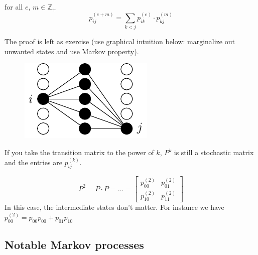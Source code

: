 \documentclass{article}
\begin{document}
\begin{proposition}{}
    for all $e$, $m \in \mathbb{Z}_+$
    \begin{equation}\label{chapkolm}
        p_{ij}^{(e+m)}=\sum_{k<j}p_{ik}^{(e)}\cdot p_{kj}^{(m)}
    \end{equation}
\end{proposition}
The proof is left as exercise (use graphical intuition below: marginalize out unwanted states and use Markov property). 
\begin{figure}[H]
    \centering
 \includegraphics{standalones/pdfs/marginchain}
    \label{mc graph} %
\end{figure}

If you take the transition matrix to the power of $k$, $P^k$ is still a stochastic matrix and the entries are $p_{ij}^{(k)}$.
\begin{example}
    \begin{figure}[H]
    \centering
    \label{sadasdasf}
\end{figure}
\[
P^2=P\cdot P=\ldots=\begin{bmatrix}
    p_{00}^{(2)} & p_{01}^{(2)}\\
    p_{10}^{(2)} & p_{11}^{(2)}
\end{bmatrix}
\]
In this case, the intermediate states don't matter. For instance we have $p_{00}^{(2)}=p_{00}p_{00}+p_{01}p_{10}$
\end{example}
\subsection{Notable Markov processes}
\end{document}
